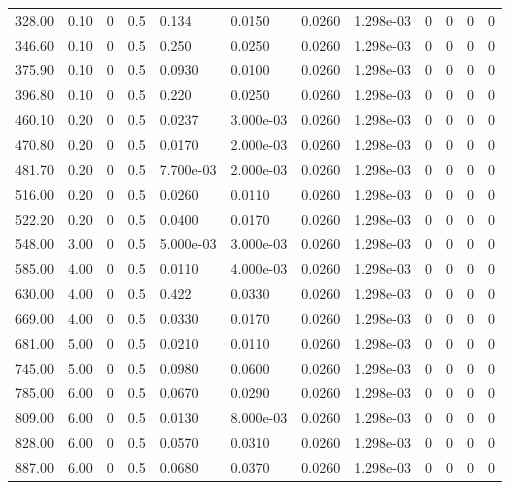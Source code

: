 \documentclass[preview]{standalone}
\begin{document}
{{\begin{tabular}{L{1.2cm}C{1.2cm} C{0.3cm}C{0.5cm} C{1.4cm}C{1.4cm} C{1.4cm}C{1.4cm} C{1.6cm}C{1.6cm} C{1.6cm}C{1.6cm}}
  328.00  &  0.10  & 0     & 0.5 &  0.134  & 0.0150  &  0.0260&   1.298e-03& 0 & 0   &  0 & 0  \\ 
  346.60  &  0.10  & 0     & 0.5 &  0.250  & 0.0250  &  0.0260&   1.298e-03& 0 & 0   &  0 & 0  \\ 
  375.90  &  0.10  & 0     & 0.5 &  0.0930  & 0.0100  &  0.0260&   1.298e-03& 0 & 0   &  0 & 0  \\ 
  396.80  &  0.10  & 0     & 0.5 &  0.220  & 0.0250  &  0.0260&   1.298e-03& 0 & 0   &  0 & 0  \\ 
  460.10  &  0.20  & 0     & 0.5 &  0.0237  & 3.000e-03  &  0.0260&   1.298e-03& 0 & 0   &  0 & 0  \\ 
  470.80  &  0.20  & 0     & 0.5 &  0.0170  & 2.000e-03  &  0.0260&   1.298e-03& 0 & 0   &  0 & 0  \\ 
  481.70  &  0.20  & 0     & 0.5 &  7.700e-03  & 2.000e-03  &  0.0260&   1.298e-03& 0 & 0   &  0 & 0  \\ 
  516.00  &  0.20  & 0     & 0.5 &  0.0260  & 0.0110  &  0.0260&   1.298e-03& 0 & 0   &  0 & 0  \\ 
  522.20  &  0.20  & 0     & 0.5 &  0.0400  & 0.0170  &  0.0260&   1.298e-03& 0 & 0   &  0 & 0  \\ 
  548.00  &  3.00  & 0     & 0.5 &  5.000e-03  & 3.000e-03  &  0.0260&   1.298e-03& 0 & 0   &  0 & 0  \\ 
  585.00  &  4.00  & 0     & 0.5 &  0.0110  & 4.000e-03  &  0.0260&   1.298e-03& 0 & 0   &  0 & 0  \\ 
  630.00  &  4.00  & 0     & 0.5 &  0.422  & 0.0330  &  0.0260&   1.298e-03& 0 & 0   &  0 & 0  \\ 
  669.00  &  4.00  & 0     & 0.5 &  0.0330  & 0.0170  &  0.0260&   1.298e-03& 0 & 0   &  0 & 0  \\ 
  681.00  &  5.00  & 0     & 0.5 &  0.0210  & 0.0110  &  0.0260&   1.298e-03& 0 & 0   &  0 & 0  \\ 
  745.00  &  5.00  & 0     & 0.5 &  0.0980  & 0.0600  &  0.0260&   1.298e-03& 0 & 0   &  0 & 0  \\ 
  785.00  &  6.00  & 0     & 0.5 &  0.0670  & 0.0290  &  0.0260&   1.298e-03& 0 & 0   &  0 & 0  \\ 
  809.00  &  6.00  & 0     & 0.5 &  0.0130  & 8.000e-03  &  0.0260&   1.298e-03& 0 & 0   &  0 & 0  \\ 
  828.00  &  6.00  & 0     & 0.5 &  0.0570  & 0.0310  &  0.0260&   1.298e-03& 0 & 0   &  0 & 0  \\ 
  887.00  &  6.00  & 0     & 0.5 &  0.0680  & 0.0370  &  0.0260&   1.298e-03& 0 & 0   &  0 & 0  \\ 

\end{tabular}}}
\end{document}
